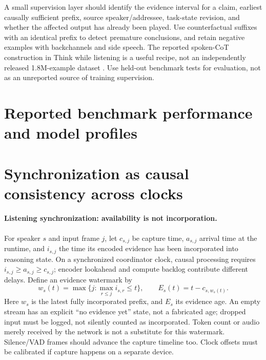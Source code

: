 \documentclass{article}
\begin{document}
A small supervision layer should identify the evidence interval for a claim, earliest causally sufficient prefix, source speaker/addressee, task-state revision, and whether the affected output has already been played. Use counterfactual suffixes with an identical prefix to detect premature conclusions, and retain negative examples with backchannels and side speech. The reported spoken-CoT construction in Think while listening is a useful recipe, not an independently released 1.8M-example dataset \citep{thinklisten}. Use held-out benchmark tests for evaluation, not as an unreported source of training supervision.

\clearpage
\section{Reported benchmark performance and model profiles}
\label{sec:performance}

\clearpage
\section{Synchronization as causal consistency across clocks}
\label{sec:clocks}
\paragraph{Listening synchronization: availability is not incorporation.}
For speaker $s$ and input frame $j$, let $c_{s,j}$ be capture time, $a_{s,j}$ arrival time at the runtime, and $i_{s,j}$ the time its encoded evidence has been incorporated into reasoning state. On a synchronized coordinator clock, causal processing requires $i_{s,j}\geq a_{s,j}\geq c_{s,j}$; encoder lookahead and compute backlog contribute different delays. Define an evidence watermark by
\begin{equation}
\label{eq:watermark}
w_s(t)=\max\{j:\max_{r\leq j}i_{s,r}\leq t\},\qquad E_s(t)=t-c_{s,w_s(t)}.
\end{equation}
Here $w_s$ is the latest fully incorporated prefix, and $E_s$ its evidence age. An empty stream has an explicit ``no evidence yet'' state, not a fabricated age; dropped input must be logged, not silently counted as incorporated. Token count or audio merely received by the network is not a substitute for this watermark. Silence/VAD frames should advance the capture timeline too. Clock offsets must be calibrated if capture happens on a separate device.
\end{document}
